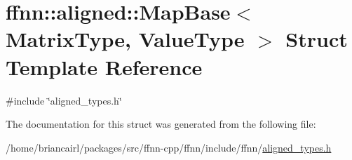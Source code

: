 \hypertarget{structffnn_1_1aligned_1_1_map_base}{\section{ffnn\-:\-:aligned\-:\-:Map\-Base$<$ Matrix\-Type, Value\-Type $>$ Struct Template Reference}
\label{structffnn_1_1aligned_1_1_map_base}
}


{\ttfamily \#include \char`\"{}aligned\-\_\-types.\-h\char`\"{}}



The documentation for this struct was generated from the following file\-:\begin{DoxyCompactItemize}
\item 
/home/briancairl/packages/src/ffnn-\/cpp/ffnn/include/ffnn/\hyperlink{aligned__types_8h}{aligned\-\_\-types.\-h}\end{DoxyCompactItemize}
